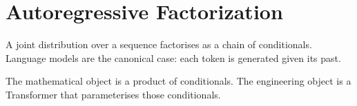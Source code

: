 \chapter{Autoregressive Factorization}
\label{ch:autoregressive}

A joint distribution over a sequence factorises as a chain of conditionals. Language models are the canonical case: each token is generated given its past.

The mathematical object is a product of conditionals. The engineering object is a Transformer that parameterises those conditionals.
